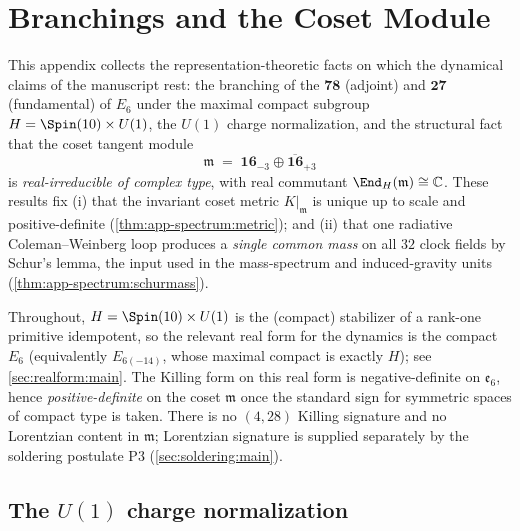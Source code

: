 \section{Branchings and the Coset Module}
\label{sec:app-spectrum:main}

This appendix collects the representation-theoretic facts on which the
dynamical claims of the manuscript rest: the branching of the
$\mathbf{78}$ (adjoint) and $\mathbf{27}$ (fundamental) of $E_6$ under
the maximal compact subgroup $H=\Spin(10)\times U(1)$, the
$U(1)$ charge normalization, and the structural fact that the coset
tangent module
\[
  \mathfrak m \;=\; \mathbf{16}_{-3}\oplus\overline{\mathbf{16}}_{+3}
\]
is \emph{real-irreducible of complex type}, with real commutant
$\End_H(\mathfrak m)\cong\mathbb C$.  These results fix (i) that the
invariant coset metric $K|_{\mathfrak m}$ is unique up to scale and
positive-definite (\autoref{thm:app-spectrum:metric}); and (ii) that one
radiative Coleman--Weinberg loop produces a \emph{single common mass} on
all $32$ clock fields by Schur's lemma, the input used in the mass-spectrum
and induced-gravity units (\autoref{thm:app-spectrum:schurmass}).

Throughout, $H=\Spin(10)\times U(1)$ is the (compact) stabilizer of a
rank-one primitive idempotent, so the relevant real form for the dynamics
is the compact $E_6$ (equivalently $E_{6(-14)}$, whose maximal compact is
exactly $H$); see \autoref{sec:realform:main}. The Killing form on this
real form is negative-definite on $\mathfrak e_6$, hence
\emph{positive-definite} on the coset $\mathfrak m$ once the standard
sign for symmetric spaces of compact type is taken. There is no
$(4,28)$ Killing signature and no Lorentzian content in $\mathfrak m$;
Lorentzian signature is supplied separately by the soldering postulate
P3 (\autoref{sec:soldering:main}).

\subsection{The $U(1)$ charge normalization}
\label{sec:app-spectrum:u1}

